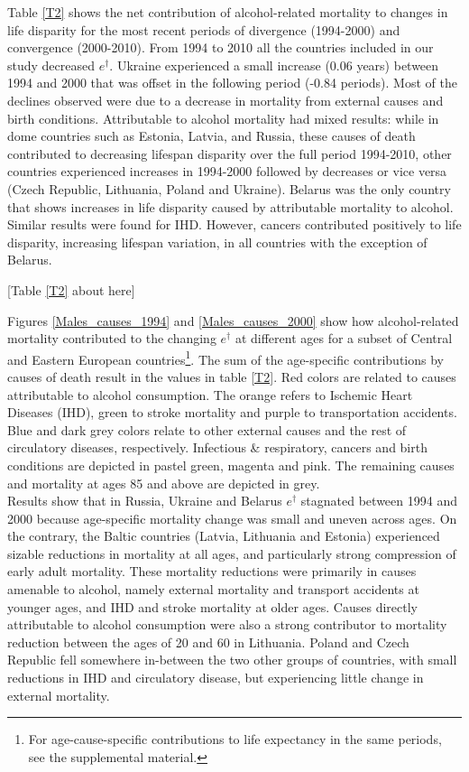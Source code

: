 \documentclass{article}
\begin{document}
\begin{spacing}{1.5}
Table \ref{T2} shows the net contribution of alcohol-related mortality to changes in life disparity for the most recent periods of divergence (1994-2000) and convergence (2000-2010). From 1994 to 2010 all the countries included in our study decreased $e^\dagger$. Ukraine experienced a small increase (0.06 years) between 1994 and 2000 that was offset in the following period (-0.84 periods). Most of the declines observed were due to a decrease in mortality from external causes and birth conditions. Attributable to alcohol mortality had mixed results: while in dome countries such as Estonia, Latvia, and Russia, these causes of death contributed to decreasing lifespan disparity over the full period 1994-2010, other countries experienced increases in 1994-2000 followed by decreases or vice versa (Czech Republic, Lithuania, Poland and Ukraine). Belarus was the only country that shows increases in life disparity caused by attributable mortality to alcohol. Similar results were found for IHD. However, cancers contributed positively to life disparity, increasing lifespan variation, in all countries with the exception of Belarus. 

\begin{center}
[Table  \ref{T2} about here]\\
\end{center}


Figures \ref{Males_causes_1994} and \ref{Males_causes_2000} show how alcohol-related mortality contributed to the changing $e^\dagger$ at different ages for a subset of Central and Eastern European countries\footnote{For age-cause-specific contributions to life expectancy in the same periods, see the supplemental material.}. The sum of the age-specific contributions by causes of death result in the values in table \ref{T2}. Red colors are related to causes attributable to alcohol consumption. The orange refers to Ischemic Heart Diseases (IHD), green to stroke mortality and purple to transportation accidents. Blue and dark grey colors relate to other external causes and the rest of circulatory diseases, respectively. Infectious \& respiratory, cancers and birth conditions are depicted in pastel green, magenta and pink. The remaining causes and mortality at ages 85 and above are depicted in grey.\\

Results show that in Russia, Ukraine and Belarus $e^\dagger$ stagnated between 1994 and 2000 because age-specific mortality change was small and uneven across ages. On the contrary, the Baltic countries (Latvia, Lithuania and Estonia) experienced sizable reductions in mortality at all ages, and particularly strong compression of early adult mortality. These mortality reductions were primarily in causes amenable to alcohol, namely external mortality and transport accidents at younger ages, and IHD and stroke mortality at older ages. Causes directly attributable to alcohol consumption were also a strong contributor to mortality reduction between the ages of 20 and 60 in Lithuania. Poland and Czech Republic fell somewhere in-between the two other groups of countries, with small reductions in IHD and circulatory disease, but experiencing little change in external mortality.\\


\end{spacing}
\end{document}
